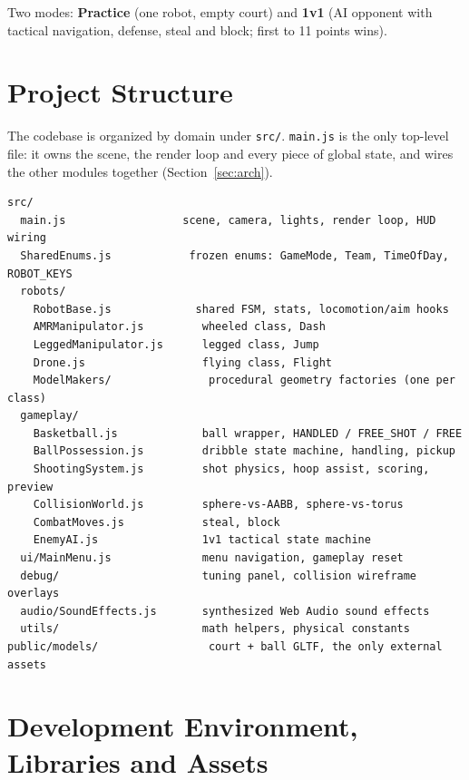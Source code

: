 \documentclass[11pt,a4paper]{article}
\newcommand{\code}[1]{\texttt{#1}}
\begin{document}
Two modes: \textbf{Practice} (one robot, empty court) and \textbf{1v1} (AI opponent with tactical navigation, defense, steal and block; first to 11 points wins).

\section{Project Structure}
\label{sec:structure}

The codebase is organized by domain under \code{src/}. \code{main.js} is the only top-level file: it owns the scene, the render loop and every piece of global state, and wires the other modules together (Section~\ref{sec:arch}).

\begin{verbatim}
src/
  main.js                  scene, camera, lights, render loop, HUD wiring
  SharedEnums.js            frozen enums: GameMode, Team, TimeOfDay, ROBOT_KEYS
  robots/
    RobotBase.js             shared FSM, stats, locomotion/aim hooks
    AMRManipulator.js         wheeled class, Dash
    LeggedManipulator.js      legged class, Jump
    Drone.js                  flying class, Flight
    ModelMakers/               procedural geometry factories (one per class)
  gameplay/
    Basketball.js             ball wrapper, HANDLED / FREE_SHOT / FREE
    BallPossession.js         dribble state machine, handling, pickup
    ShootingSystem.js         shot physics, hoop assist, scoring, preview
    CollisionWorld.js         sphere-vs-AABB, sphere-vs-torus
    CombatMoves.js            steal, block
    EnemyAI.js                1v1 tactical state machine
  ui/MainMenu.js              menu navigation, gameplay reset
  debug/                      tuning panel, collision wireframe overlays
  audio/SoundEffects.js       synthesized Web Audio sound effects
  utils/                      math helpers, physical constants
public/models/                 court + ball GLTF, the only external assets
\end{verbatim}

\section{Development Environment, Libraries and Assets}
\label{sec:env}
\end{document}
